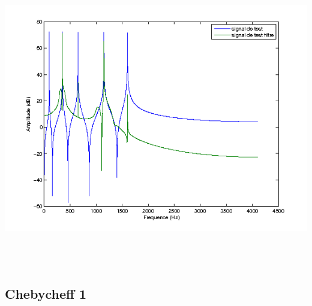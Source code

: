 \documentclass{article}
\begin{document}
\inputminted[linenos,firstnumber=34,firstline=34,lastline=43]{matlab}{RII_butter.m}
\includegraphics[height=13cm]{butt_3}

\subsection{Chebycheff 1}
\end{document}
